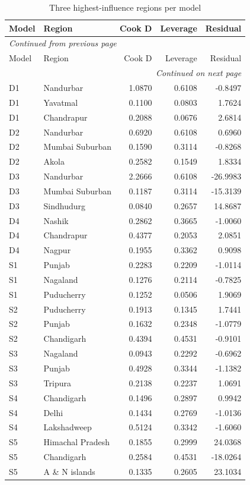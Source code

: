 \documentclass[11pt,a4paper]{report}
\begin{document}
\begin{longtable}{l>{\raggedright\arraybackslash}p{5cm}rrr}
\caption{Three highest-influence regions per model}\\\toprule
Model & Region & Cook D & Leverage & Residual \\\midrule\endfirsthead
\multicolumn{5}{l}{\textit{Continued from previous page}}\\\toprule
Model & Region & Cook D & Leverage & Residual \\\midrule\endhead
\midrule\multicolumn{5}{r}{\textit{Continued on next page}}\\\endfoot\bottomrule\endlastfoot
D1 & Nandurbar & 1.0870 & 0.6108 & -0.8497 \\
D1 & Yavatmal & 0.1100 & 0.0803 & 1.7624 \\
D1 & Chandrapur & 0.2088 & 0.0676 & 2.6814 \\
D2 & Nandurbar & 0.6920 & 0.6108 & 0.6960 \\
D2 & Mumbai Suburban & 0.1590 & 0.3114 & -0.8268 \\
D2 & Akola & 0.2582 & 0.1549 & 1.8334 \\
D3 & Nandurbar & 2.2666 & 0.6108 & -26.9983 \\
D3 & Mumbai Suburban & 0.1187 & 0.3114 & -15.3139 \\
D3 & Sindhudurg & 0.0840 & 0.2657 & 14.8687 \\
D4 & Nashik & 0.2862 & 0.3665 & -1.0060 \\
D4 & Chandrapur & 0.4377 & 0.2053 & 2.0851 \\
D4 & Nagpur & 0.1955 & 0.3362 & 0.9098 \\
S1 & Punjab & 0.2283 & 0.2209 & -1.0114 \\
S1 & Nagaland & 0.1276 & 0.2114 & -0.7825 \\
S1 & Puducherry & 0.1252 & 0.0506 & 1.9069 \\
S2 & Puducherry & 0.1913 & 0.1345 & 1.7441 \\
S2 & Punjab & 0.1632 & 0.2348 & -1.0779 \\
S2 & Chandigarh & 0.4394 & 0.4531 & -0.9101 \\
S3 & Nagaland & 0.0943 & 0.2292 & -0.6962 \\
S3 & Punjab & 0.4928 & 0.3344 & -1.1382 \\
S3 & Tripura & 0.2138 & 0.2237 & 1.0691 \\
S4 & Chandigarh & 0.1496 & 0.2897 & 0.9942 \\
S4 & Delhi & 0.1434 & 0.2769 & -1.0136 \\
S4 & Lakshadweep & 0.5124 & 0.3342 & -1.6060 \\
S5 & Himachal Pradesh & 0.1855 & 0.2999 & 24.0368 \\
S5 & Chandigarh & 0.2584 & 0.4531 & -18.0264 \\
S5 & A \& N islands & 0.1335 & 0.2605 & 23.1034 \\
\end{longtable}\endgroup
\end{document}
